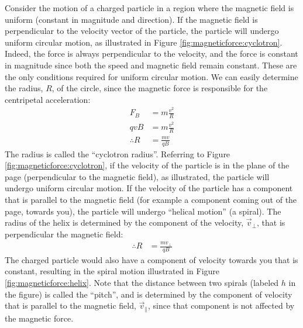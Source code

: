 Consider the motion of a charged particle in a region where the magnetic field is uniform (constant in magnitude and direction). If the magnetic field is perpendicular to the velocity vector of the particle, the particle will undergo uniform circular motion, as illustrated in Figure \ref{fig:magneticforce:cyclotron}. 
Indeed, the force is always perpendicular to the velocity, and the force is constant in magnitude since both the speed and magnetic field remain constant. These are the only conditions required for uniform circular motion. We can easily determine the radius, $R$, of the circle, since the magnetic force is responsible for the centripetal acceleration:
\begin{align*}
F_B &= m\frac{v^2}{R}\\
qvB &= m\frac{v^2}{R}\\
\therefore R &= \frac{mv}{qB}
\end{align*}
The radius is called the ``cyclotron radius''. 
Referring to Figure \ref{fig:magneticforce:cyclotron}, if the velocity of the particle is in the plane of the page (perpendicular to the magnetic field), as illustrated, the particle will undergo uniform circular motion. If the velocity of the particle has a component that is parallel to the magnetic field (for example a component coming out of the page, towards you), the particle will undergo ``helical motion'' (a spiral). The radius of the helix is determined by the component of the velocity, $\vec v_{\perp}$, that is perpendicular the magnetic field:
\begin{align*}
\therefore R &= \frac{mv_{\perp}}{qB}
\end{align*}
The charged particle would also have a component of velocity towards you that is constant, resulting in the spiral motion illustrated in Figure \ref{fig:magneticforce:helix}. Note that the distance between two spirals (labeled $h$ in the figure) is called the ``pitch'', and is determined by the component of velocity that is parallel to the magnetic field, $\vec v_\parallel$, since that component is not affected by the magnetic force. 
